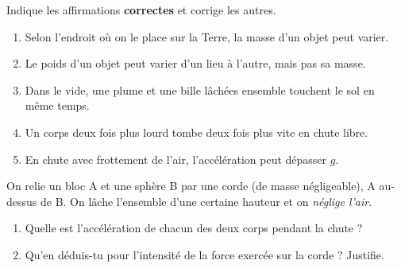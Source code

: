 \documentclass[11pt,a4paper]{article}
\newcommand{\vv}[1]{\vec{#1}}\newcommand{\ds}{\displaystyle}
\begin{document}
\begin{exo}
Indique les affirmations \textbf{correctes} et corrige les autres.
\begin{enumerate}[label=\arabic*.]
  \item Selon l'endroit où on le place sur la Terre, la masse d'un objet peut varier.
  \item Le poids d'un objet peut varier d'un lieu à l'autre, mais pas sa masse.
  \item Dans le vide, une plume et une bille lâchées ensemble touchent le sol en même temps.
  \item Un corps deux fois plus lourd tombe deux fois plus vite en chute libre.
  \item En chute avec frottement de l'air, l'accélération peut dépasser $g$.
\end{enumerate}
\end{exo}

\begin{exo}
On relie un bloc A et une sphère B par une corde (de masse négligeable), A au-dessus de B. On lâche
l'ensemble d'une certaine hauteur et on \emph{néglige l'air}.
\begin{center}
\end{center}
\begin{enumerate}[label=\alph*)]
  \item Quelle est l'accélération de chacun des deux corps pendant la chute ?
  \item Qu'en déduis-tu pour l'intensité de la force exercée sur la corde ? Justifie.
\end{enumerate}
\end{exo}
\end{document}
